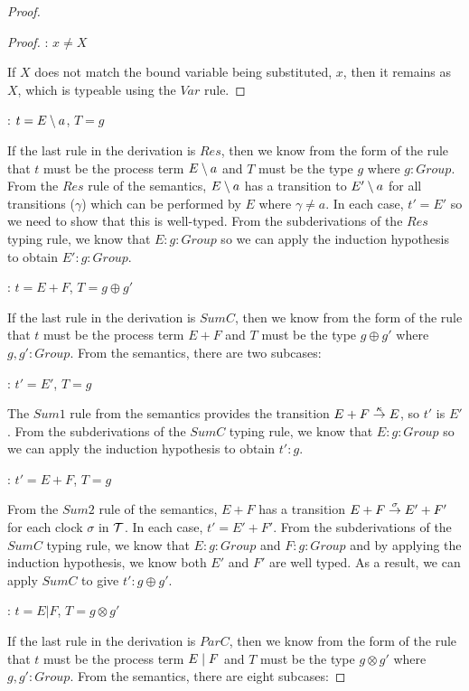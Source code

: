 \begin{proof}
\begin{proof}
: $x \ne X$

\noindent If $X$ does not match the bound variable being substituted, $x$, then it
remains as $X$, which is typeable using the $Var$ rule.

\end{proof}

: $t = E \setminus {a}$, $T = g$

\noindent If the last rule in the derivation is $Res$, then we know
from the form of the rule that $t$ must be the process term $E
\setminus {a}$ and $T$ must be the type $g$ where $g : Group$.  From the
$Res$ rule of the semantics, $E \setminus {a}$ has a transition to $E'
\setminus {a}$ for all transitions ($\gamma$) which can be performed by $E$
where $\gamma \ne a$.  In each case, $t' = E'$ so we need
to show that this is well-typed.  From the subderivations of the $Res$
typing rule, we know that $E : g : Group$ so we can apply the
induction hypothesis to obtain $E' : g : Group$.

: $t = E + F$, $T = g \oplus g'$

\noindent If the last rule in the derivation is $SumC$, then we know
from the form of the rule that $t$ must be the process term $E + F$
and $T$ must be the type $g \oplus g'$ where $g, g' : Group$.  From
the semantics, there are two subcases:

: $t' = E'$, $T = g$

\noindent The $Sum1$ rule from the semantics provides the transition
$E + F \stackrel{\kappa}{\rightarrow} E$, so $t'$ is $E'$.  From the
subderivations of the $SumC$ typing rule, we know that $E : g : Group$
so we can apply the induction hypothesis to obtain $t' : g$.

: $t' = E + F$, $T = g$

\noindent From the $Sum2$ rule of the semantics, $E + F$ has a
transition $E + F \stackrel{\sigma}{\rightarrow} E' + F'$ for each clock $\sigma$ in
$\text{$\mathcal{T}$}$.  In each case, $t' = E' + F'$.  From the subderivations of
the $SumC$ typing rule, we know that $E : g : Group$ and $F : g :
Group$ and by applying the induction hypothesis, we know both $E'$ and
$F'$ are well typed.  As a result, we can apply $SumC$ to give $t' : g
\oplus g'$.

: $t = E | F$, $T = g \otimes g'$

\noindent If the last rule in the derivation is $ParC$, then we know
from the form of the rule that $t$ must be the process term $E \;|\; F$
and $T$ must be the type $g \otimes g'$ where $g, g' : Group$.  From
the semantics, there are eight subcases:


\end{proof}
